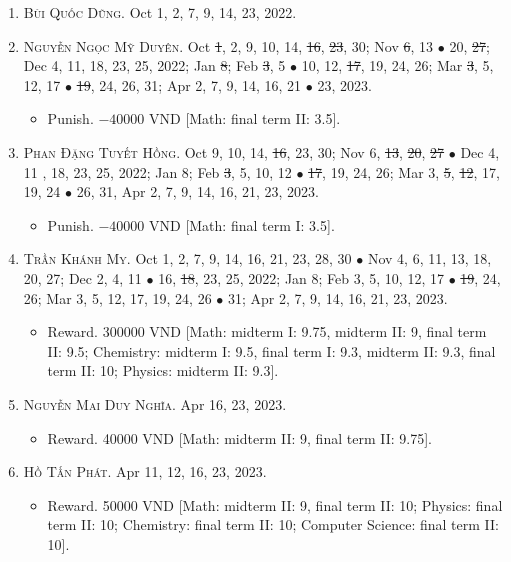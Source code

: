 \documentclass{article}
\begin{document}
\begin{enumerate}
	\item \textsc{Bùi Quốc Dũng.} {\sf[In]} Oct 1, 2, 7, 9, 14, 23, 2022. {\sf[Out]}
	\item \textsc{Nguyễn Ngọc Mỹ Duyên.} {\sf[In]} Oct \st{1}, 2, 9, 10, 14, \st{16}, \st{23}, 30; Nov \st{6}, 13 $\bullet$ 20, \st{27}; Dec 4, 11, 18, 23, 25, 2022; Jan \st{8}; Feb \st{3}, 5 $\bullet$ 10, 12, \st{17}, 19, 24, 26; Mar \st{3}, 5, 12, 17 $\bullet$ \st{19}, 24, 26, 31; Apr 2, 7, 9, 14, 16, 21 $\bullet$ 23, 2023.
	\begin{itemize}
		\item {\sf Punish.} $-40000$ VND [Math: final term II: 3.5].
	\end{itemize}
	\item \textsc{Phan Đặng Tuyết Hồng.} {\sf[In]} Oct 9, 10, 14, \st{16}, 23, 30; Nov 6, \st{13}, \st{20}, \st{27} $\bullet$ Dec 4, 11 , 18, 23, 25, 2022; Jan 8; Feb \st{3}, 5, 10, 12 $\bullet$ \st{17}, 19, 24, 26; Mar 3, \st{5}, \st{12}, 17, 19, 24 $\bullet$ 26, 31, Apr 2, 7, 9, 14, 16, 21, 23, 2023.
	\begin{itemize}
		\item {\sf Punish.} $-40000$ VND [Math: final term I: 3.5].
	\end{itemize}
	\item \textsc{Trần Khánh My.} {\sf[In]} Oct 1, 2, 7, 9, 14, 16, 21, 23, 28, 30 $\bullet$ Nov 4, 6, 11, 13, 18, 20, 27; Dec 2, 4, 11 $\bullet$ 16, \st{18}, 23, 25, 2022; Jan 8; Feb 3, 5, 10, 12, 17 $\bullet$ \st{19}, 24, 26; Mar 3, 5, 12, 17, 19, 24, 26 $\bullet$ 31; Apr 2, 7, 9, 14, 16, 21, 23, 2023.
	\begin{itemize}
		\item {\sf Reward.} 300000 VND [Math: midterm I: 9.75, midterm II: 9, final term II: 9.5;  Chemistry: midterm I: 9.5, final term I: 9.3, midterm II: 9.3, final term II: 10; Physics: midterm II: 9.3].
	\end{itemize}
	\item \textsc{Nguyễn Mai Duy Nghĩa.} {\sf[In]} Apr 16, 23, 2023.
	\begin{itemize}
		\item {\sf Reward.} 40000 VND [Math: midterm II: 9, final term II: 9.75].
	\end{itemize}
	\item \textsc{Hồ Tấn Phát.} {\sf[In]} Apr 11, 12, 16, 23, 2023.
	\begin{itemize}
		\item {\sf Reward.} 50000 VND [Math: midterm II: 9, final term II: 10; Physics: final term II: 10; Chemistry: final term II: 10; Computer Science: final term II: 10].

\end{itemize}
\end{enumerate}
\end{document}
